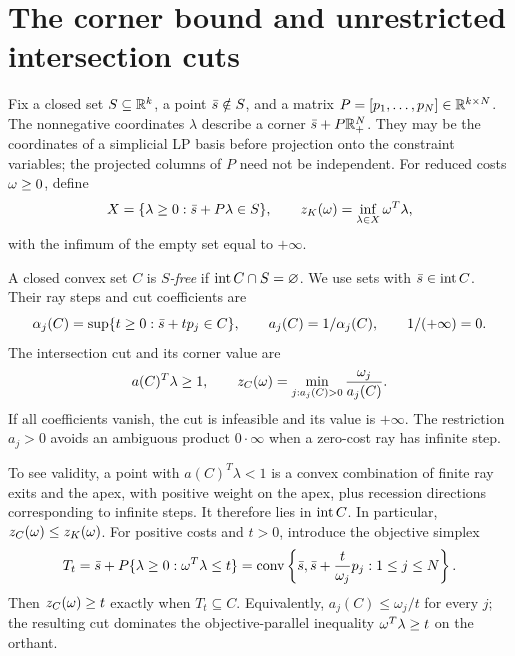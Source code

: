 \section{The corner bound and unrestricted intersection cuts}
\label{fd:section}

Fix a closed set $S\subseteq\mathbb R^k$, a point $\bar s\notin S$, and a matrix
$P=[p_1,\ldots,p_N]\in\mathbb R^{k\times N}$. The nonnegative coordinates
$\lambda$ describe a corner $\bar s+P\mathbb R_+^N$. They may be the coordinates of
a simplicial LP basis before projection onto the constraint variables;
the projected columns of $P$ need not be independent. For reduced costs
$\omega\ge0$, define
\begin{equation}\label{fd:corner-def}
 X=\{\lambda\ge0:\bar s+P\lambda\in S\},\qquad
 z_K(\omega)=\inf_{\lambda\in X}\omega^T\lambda,
\end{equation}
with the infimum of the empty set equal to $+\infty$.

A closed convex set $C$ is \emph{$S$-free} if
$\operatorname{int} C\cap S=\varnothing$. We use sets with $\bar s\in\operatorname{int} C$. Their
ray steps and cut coefficients are
\[
 \alpha_j(C)=\sup\{t\ge0:\bar s+tp_j\in C\},\qquad
 a_j(C)=1/\alpha_j(C),\qquad 1/(+\infty)=0.
\]
The intersection cut and its corner value are
\begin{equation}\label{fd:cut-value}
 a(C)^T\lambda\ge1,\qquad
 z_C(\omega)=\min_{j:a_j(C)>0}\frac{\omega_j}{a_j(C)}.
\end{equation}
If all coefficients vanish, the cut is infeasible and its value is
$+\infty$. The restriction $a_j>0$ avoids an ambiguous product
$0\cdot\infty$ when a zero-cost ray has infinite step.

To see validity, a point with $a(C)^T\lambda<1$ is a convex combination
of finite ray exits and the apex, with positive weight on the apex,
plus recession directions corresponding to infinite steps. It therefore
lies in $\operatorname{int} C$. In particular, $z_C(\omega)\le z_K(\omega)$.
For positive costs and $t>0$, introduce the objective simplex
\begin{equation}\label{fd:simplex-def}
 T_t=\bar s+P\{\lambda\ge0:\omega^T\lambda\le t\}
 =\operatorname{conv}\left\{\bar s,\bar s+\frac{t}{\omega_j}p_j:1\le j\le N\right\}.
\end{equation}
Then $z_C(\omega)\ge t$ exactly when $T_t\subseteq C$. Equivalently,
$a_j(C)\le\omega_j/t$ for every $j$; the resulting cut dominates the
objective-parallel inequality $\omega^T\lambda\ge t$ on the orthant.

